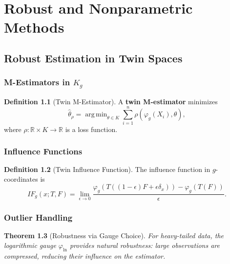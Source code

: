 \documentclass[11pt,twoside]{book}
\theoremstyle{plain}
\newtheorem{theorem}{Theorem}[chapter]
\theoremstyle{definition}
\newtheorem{definition}[theorem]{Definition}
\theoremstyle{remark}
\newcommand{\R}{\mathbb{R}}
\newcommand{\Kg}{K_g}
\DeclareMathOperator*{\argmin}{arg\,min}
\begin{document}

\part{Robust and Nonparametric Methods}
\label{part:robust}


\chapter{Robust Estimation in Twin Spaces}
\label{ch:robust}

\section{M-Estimators in $\Kg$}
\label{sec:m_estimators}

\begin{definition}[Twin M-Estimator]
    A \textbf{twin M-estimator} minimizes
    \[
    \hat{\theta}_\rho = \argmin_{\theta \in K} \sum_{i=1}^n \rho(\varphi_g(X_i), \theta),
    \]
    where $\rho : \R \times K \to \R$ is a loss function.
\end{definition}

\section{Influence Functions}
\label{sec:influence}

\begin{definition}[Twin Influence Function]
    The influence function in $g$-coordinates is
    \[
    IF_g(x; T, F) = \lim_{\epsilon \to 0} \frac{\varphi_g(T((1-\epsilon)F + \epsilon \delta_x)) - \varphi_g(T(F))}{\epsilon}.
    \]
\end{definition}

\section{Outlier Handling}
\label{sec:outliers}

\begin{theorem}[Robustness via Gauge Choice]
    For heavy-tailed data, the logarithmic gauge $\varphi_{\ln}$ provides natural robustness: large observations are compressed, reducing their influence on the estimator.
\end{theorem}
\end{document}
